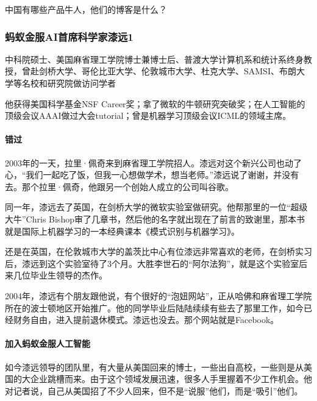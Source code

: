 \documentclass[letterpaper,11pt,english]{sphinxmanual}
\begin{document}
中国有哪些产品牛人，他们的博客是什么？


\subsubsection{蚂蚁金服AI首席科学家漆远1\sphinxfootnotemark[818]}
\label{\detokenize{chapter_AI_dive/qi_yuan:ai1}}\label{\detokenize{chapter_AI_dive/qi_yuan::doc}}%
\begin{footnotetext}[818]\sphinxAtStartFootnote
{}
%
\end{footnotetext}\ignorespaces 
中科院硕士、美国麻省理工学院博士兼博士后、普渡大学计算机系和统计系终身教授，曾赴剑桥大学、哥伦比亚大学、伦敦城市大学、杜克大学、SAMSI、布朗大学等名校和研究院做访问学者

他获得美国科学基金NSF
Career奖；拿了微软的牛顿研究突破奖；在人工智能的顶级会议AAAI做过大会tutorial；曾是机器学习顶级会议ICML的领域主席。


\paragraph{错过}
\label{\detokenize{chapter_AI_dive/qi_yuan:id1}}
2003年的一天，拉里·佩奇来到麻省理工学院招人。漆远对这个新兴公司也动了心，“我们一起吃了饭，但我一心想做学术，想当老师。”漆远说了谢谢，并没有去。那个拉里·佩奇，他跟另一个创始人成立的公司叫谷歌。

同一年，漆远去了英国，在剑桥大学的微软实验室做研究。他帮那里的一位“超级大牛”Chris
Bishop审了几章书，然后他的名字就出现在了前言的致谢里，那本书就是国际上机器学习的一本经典课本《模式识别与机器学习》。

还是在英国，在伦敦城市大学的盖茨比中心有位漆远非常喜欢的老师，在剑桥实习后，漆远到这个实验室待了3个月。大胜李世石的“阿尔法狗”，就是这个实验室后来几位毕业生领导的杰作。

2004年，漆远有个朋友跟他说，有个很好的“泡妞网站”，正从哈佛和麻省理工学院所在的波士顿地区开始推广。他的同学毕业后陆陆续续有些去了那里工作，如今已经财务自由，进入提前退休模式。漆远也没去。那个网站就是Facebook。


\paragraph{加入蚂蚁金服人工智能}
\label{\detokenize{chapter_AI_dive/qi_yuan:id2}}
如今漆远领导的团队里，有大量从美国回来的博士，一些出自高校，一些则是从美国的大企业跳槽而来。由于这个领域发展迅速，很多人手里握着不少工作机会。他对记者说，自己从美国招了不少人回来，但不是“说服”他们，而是“吸引”他们。
\end{document}
